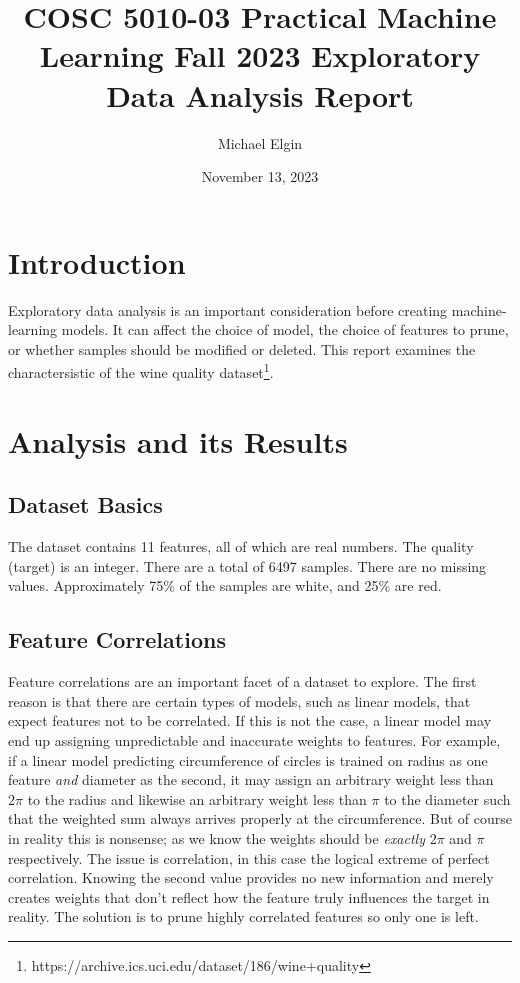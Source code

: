 \documentclass[12pt, letterpaper]{article}
\title{COSC 5010-03 Practical Machine Learning Fall 2023 Exploratory Data Analysis Report}
\author{Michael Elgin}
\date{November 13, 2023}
\begin{document}
\maketitle

\section{Introduction} %

Exploratory data analysis is an important consideration before creating machine-learning models. It can affect the choice of model, the choice of features to prune, or whether samples should be modified or deleted. This report examines the charactersistic of the wine quality dataset\footnote{https://archive.ics.uci.edu/dataset/186/wine+quality}.

\section{Analysis and its Results}

\subsection{Dataset Basics}

The dataset contains 11 features, all of which are real numbers. The quality (target) is an integer. There are a total of 6497 samples. There are no missing values. Approximately 75\% of the samples are white, and 25\% are red.

\subsection{Feature Correlations}

Feature correlations are an important facet of a dataset to explore. The first reason is that there are certain types of models, such as linear models, that expect features not to be correlated. If this is not the case, a linear model may end up assigning unpredictable and inaccurate weights to features. For example, if a linear model predicting circumference of circles is trained on radius as one feature \emph{and} diameter as the second, it may assign an arbitrary weight less than $2\pi$ to the radius and likewise an arbitrary weight less than $\pi$ to the diameter such that the weighted sum always arrives properly at the circumference. But of course in reality this is nonsense; as we know the weights should be \emph{exactly} $2\pi$ and $\pi$ respectively. The issue is correlation, in this case the logical extreme of perfect correlation. Knowing the second value provides no new information and merely creates weights that don't reflect how the feature truly influences the target in reality. The solution is to prune highly correlated features so only one is left.
\end{document}
